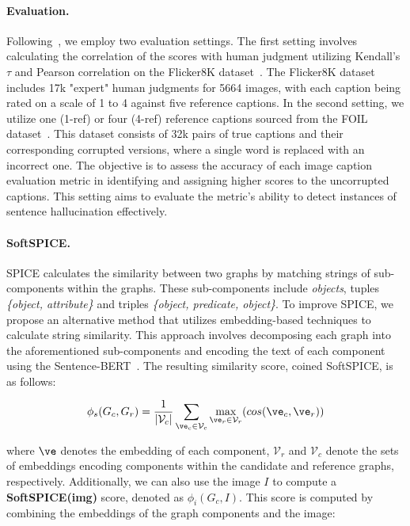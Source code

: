 \paragraph{Evaluation.} Following~\citet{hessel2021clipscore}, we employ two evaluation settings. The first setting involves calculating the correlation of the scores with human judgment utilizing Kendall's $\tau$ and Pearson correlation on the Flicker8K dataset~\cite{hodosh2013framing}. The Flicker8K dataset includes 17k "expert" human judgments for 5664 images, with each caption being rated on a scale of 1 to 4 against five reference captions. In the second setting, we utilize one (1-ref) or four (4-ref) reference captions sourced from the FOIL dataset~\cite{shekhar2017foil}. This dataset consists of 32k pairs of true captions and their corresponding corrupted versions, where a single word is replaced with an incorrect one. The objective is to assess the accuracy of each image caption evaluation metric in identifying and assigning higher scores to the uncorrupted captions. This setting aims to evaluate the metric's ability to detect instances of sentence hallucination effectively.


\paragraph{SoftSPICE.} SPICE calculates the similarity between two graphs by matching strings of sub-components within the graphs. These sub-components include \textit{objects}, tuples \textit{\{object, attribute\}} and triples \textit{\{object, predicate, object\}}. To improve SPICE, we propose an alternative method that utilizes embedding-based techniques to calculate string similarity. This approach involves decomposing each graph into the aforementioned sub-components and encoding the text of each component using the Sentence-BERT~\cite{reimers2019sentence}. The resulting similarity score, coined SoftSPICE, is as follows:

\begin{small}
\begin{align}
    \phi_s(G_c,G_r) = \frac{1}{|\mathcal{V}_c|}\sum_{\ve_c\in\mathcal{V}_c}\max_{\ve_r\in\mathcal{V}_{r}}(cos(\ve_c,\ve_r))
\end{align}
\end{small}
\noindent where $\ve$ denotes the embedding of each component, $\mathcal{V}_{r}$ and $\mathcal{V}_{c}$ denote the sets of embeddings encoding components within the candidate and reference graphs, respectively. Additionally, we can also use the image $I$ to compute a \textbf{SoftSPICE(img)} score, denoted as $\phi_i(G_c,I)$. This score is computed by combining the embeddings of the graph components and the image:


